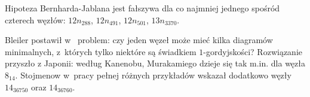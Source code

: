 \begin{example}
%
%
%
%
    Hipoteza Bernharda-Jablana jest fałszywa dla co najmniej jednego spośród czterech węzłów: $12n_{288}$, $12n_{491}$, $12n_{501}$, $13n_{3370}$.
\end{example}

Bleiler postawił w~\cite{bleiler84} problem: czy jeden węzeł może mieć kilka diagramów minimalnych, z~których tylko niektóre są świadkiem $1$-gordyjskości?
Rozwiązanie przyszło z Japonii: według Kanenobu, Murakamiego \cite{kanenobumurakami86} dzieje się tak m.in. dla węzła $8_{14}$.
%
%
%
Stojmenow w~pracy \cite{stoimenow01} pełnej różnych przykładów wskazał dodatkowo węzły $14_{36750}$ oraz $14_{36760}$.
%
%
%

